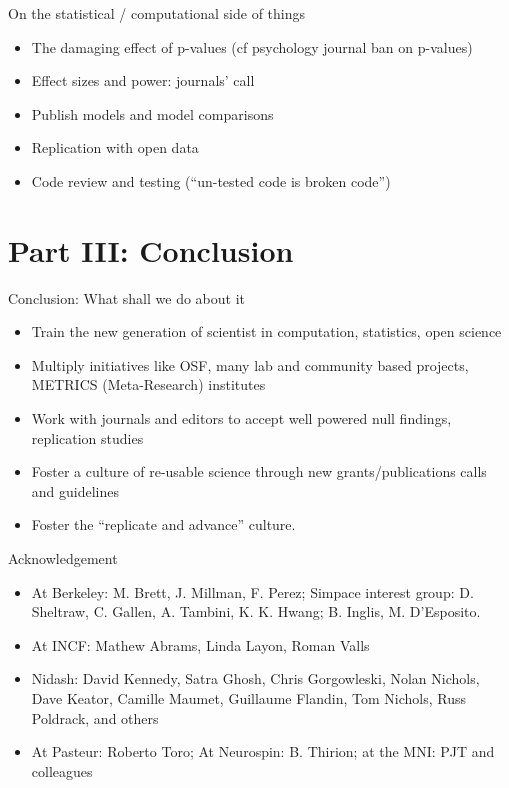 \documentclass[ignorenonframetext,]{beamer}
\begin{document}
\begin{frame}{On the statistical / computational side of things}

\begin{itemize}[<+->]
\itemsep1pt\parskip0pt
\item
  The damaging effect of p-values (cf psychology journal ban on
  p-values)
\item
  Effect sizes and power: journals' call
\item
  Publish models and model comparisons
\item
  Replication with open data
\item
  Code review and testing (``un-tested code is broken code'')
\end{itemize}

\end{frame}

\section{Part III: Conclusion}\label{part-iii-conclusion}

\begin{frame}{Conclusion: What shall we do about it}

\begin{itemize}[<+->]
\itemsep1pt\parskip0pt
\item
  Train the new generation of scientist in computation, statistics, open
  science
\item
  Multiply initiatives like OSF, many lab and community based projects,
  METRICS (Meta-Research) institutes
\item
  Work with journals and editors to accept well powered null findings,
  replication studies
\item
  Foster a culture of re-usable science through new grants/publications
  calls and guidelines
\item
  Foster the ``replicate and advance'' culture.
\end{itemize}

\end{frame}

\begin{frame}{Acknowledgement}

\begin{itemize}
\itemsep1pt\parskip0pt
\item
  At Berkeley: M. Brett, J. Millman, F. Perez; Simpace interest group:
  D. Sheltraw, C. Gallen, A. Tambini, K. K. Hwang; B. Inglis, M.
  D'Esposito.
\item
  At INCF: Mathew Abrams, Linda Layon, Roman Valls
\item
  Nidash: David Kennedy, Satra Ghosh, Chris Gorgowleski, Nolan Nichols,
  Dave Keator, Camille Maumet, Guillaume Flandin, Tom Nichols, Russ
  Poldrack, and others
\item
  At Pasteur: Roberto Toro; At Neurospin: B. Thirion; at the MNI: PJT
  and colleagues
\end{itemize}

\end{frame}
\end{document}
